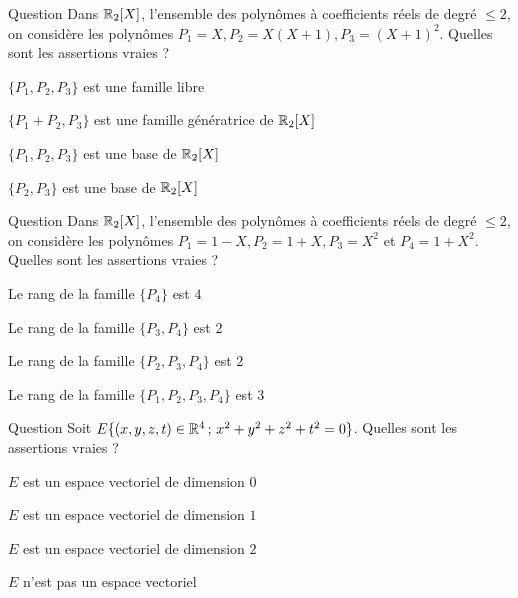 \begin{multi}[multiple,feedback=
{On vérifie que \(\{P_1,P_2,P_3 \}\) est une famille libre de \(\Rr_2[X]\). De plus, cette famille contient 
\(3\) polynômes  et la dimension de \(\Rr_2[X]\) est \(3\), donc c'est une base de \(\Rr_2[X]\).
}]{Question}
Dans \(\Rr_2[X]\), l'ensemble des polynômes à coefficients réels de degré \(\le 2\), on considère les polynômes \(P_1= X, P_2= X(X+1), P_3 = (X+1)^2\). Quelles sont les assertions vraies ?

    \item* \(\{P_1,P_2,P_3 \}\) est une famille libre
    \item \(\{P_1+P_2,P_3 \}\) est une famille génératrice de \(\Rr_2[X]\)
    \item* \(\{P_1,P_2,P_3 \}\) est une base de \(\Rr_2[X]\)
    \item \(\{P_2,P_3 \}\) est une base de \(\Rr_2[X]\)
\end{multi}


\begin{multi}[multiple,feedback=
{Le rang d'une famille de vecteurs est la dimension du sous-espace vectoriel
engendré par ces vecteurs. Autrement dit, c'est le nombre maximum de vecteurs de cette famille qui sont linéairement indépendants.
}]{Question}
Dans  \(\Rr_2[X]\), l'ensemble des polynômes à coefficients réels de degré \(\le 2\), on considère les polynômes \(P_1= 1-X, P_2= 1+X, P_3 = X^2\) et \(P_4=1+X^2\). Quelles sont les assertions vraies ?

    \item Le rang de la famille \(\{P_4\}\) est \(4\)
    \item* Le rang de la famille \(\{P_3,P_4\}\) est \(2\)
    \item Le rang de la famille \(\{P_2,P_3,P_4\}\) est \(2\)
    \item* Le rang de la famille \(\{P_1,P_2,P_3,P_4\}\) est \(3\)
\end{multi}


\begin{multi}[multiple,feedback=
{\(E=\{(0,0,0,0)\}\) est un espace vectoriel de dimension \(0\).
}]{Question}
Soit \(E \{(x,y,z,t) \in \mathbb{R}^4 \, ; \, x^2+y^2 +z^2+t^2=0\}\). Quelles sont les assertions vraies ?

    \item* \(E\) est un espace vectoriel de dimension \(0\)
    \item \(E\) est un espace vectoriel de dimension \(1\)
    \item \(E\) est un espace vectoriel de dimension \(2\)
    \item \(E\) n'est pas un espace vectoriel
\end{multi}


